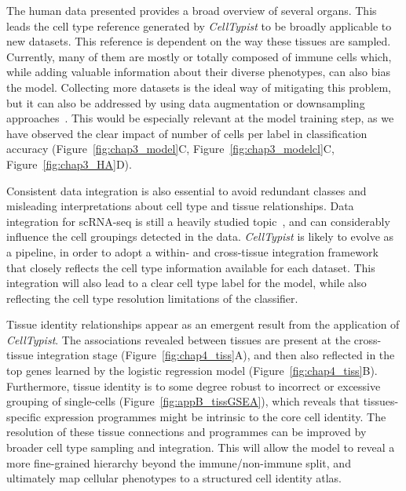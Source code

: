 The human data presented provides a broad overview of several organs. This leads the cell type reference generated by \textit{CellTypist} to be broadly applicable to new datasets. This reference is dependent on the way these tissues are sampled. Currently, many of them are mostly or totally composed of immune cells which, while adding valuable information about their diverse phenotypes, can also bias the model. Collecting more datasets is the ideal way of mitigating this problem, but it can also be addressed by using data augmentation or downsampling approaches~\citep{wong_understanding_2016,hie_geometric_2019}. This would be especially relevant at the model training step, as we have observed the clear impact of number of cells per label in classification accuracy (Figure~\ref{fig:chap3_model}C, Figure~\ref{fig:chap3_modelcl}C, Figure~\ref{fig:chap3_HA}D).

Consistent data integration is also essential to avoid redundant classes and misleading interpretations about cell type and tissue relationships. Data integration for scRNA-seq is still a heavily studied topic~\citep{haghverdi_batch_2018,lopez_deep_2018,polanski_bbknn:_2019, stuart_comprehensive_2019}, and can considerably influence the cell groupings detected in the data. \textit{CellTypist} is likely to evolve as a pipeline, in order to adopt a within- and cross-tissue integration framework that closely reflects the cell type information available for each dataset. This integration will also lead to a clear cell type label for the model, while also reflecting the cell type resolution limitations of the classifier.

Tissue identity relationships appear as an emergent result from the application of \textit{CellTypist}. The associations revealed between tissues are present at the cross-tissue integration stage (Figure~\ref{fig:chap4_tiss}A), and then also reflected in the top genes learned by the logistic regression model (Figure~\ref{fig:chap4_tiss}B). Furthermore, tissue identity is to some degree robust to incorrect or excessive grouping of single-cells (Figure~\ref{fig:appB_tissGSEA}), which reveals that tissues-specific expression programmes might be intrinsic to the core cell identity. The resolution of these tissue connections and programmes can be improved by broader cell type sampling and integration. This will allow the model to reveal a more fine-grained hierarchy beyond the immune/non-immune split, and ultimately map cellular phenotypes to a structured cell identity atlas.

